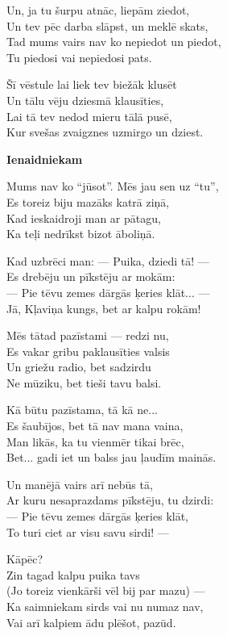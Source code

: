 \documentclass[14pt]{extarticle}
\begin{document}
{{Un, ja tu šurpu atnāc, liepām ziedot,\\
Un tev pēc darba slāpst, un meklē skats,\\
Tad mums vairs nav ko nepiedot un piedot,\\
Tu piedosi vai nepiedosi pats. 

Šī vēstule lai liek tev biežāk klusēt\\
Un tālu vēju dziesmā klausīties,\\
Lai tā tev nedod mieru tālā pusē,\\
Kur svešas zvaigznes uzmirgo un dziest. 

\newpage

{\bf Ienaidniekam}

Mums nav ko ``jūsot''. Mēs jau sen uz ``tu'',\\
Es toreiz biju mazāks katrā ziņā,\\
Kad ieskaidroji man ar pātagu,\\
Ka teļi nedrīkst bizot āboliņā. 

Kad uzbrēci man: --- Puika, dziedi tā! ---\\
Es drebēju un pīkstēju ar mokām:\\
--- Pie tēvu zemes dārgās ķeries klāt... ---\\
Jā, Kļaviņa kungs, bet ar kalpu rokām!

Mēs tātad pazīstami --- redzi nu,\\
Es vakar gribu paklausīties valsis\\
Un griežu radio, bet sadzirdu\\
Ne mūziku, bet tieši tavu balsi. 

Kā būtu pazīstama, tā kā ne...\\
Es šaubījos, bet tā nav mana vaina,\\
Man likās, ka tu vienmēr tikai brēc,\\
Bet... gadi iet un balss jau ļaudīm mainās. 

Un manējā vairs arī nebūs tā,\\
Ar kuru nesaprazdams pīkstēju, tu dzirdi:\\
--- Pie tēvu zemes dārgās ķeries klāt,\\
To turi ciet ar visu savu sirdi! ---

Kāpēc?\\
Zin tagad kalpu puika tavs\\
(Jo toreiz vienkārši vēl bij par mazu) ---\\
Ka saimniekam sirds vai nu numaz nav,\\
Vai arī kalpiem ādu plēšot, pazūd.

}}
\end{document}
